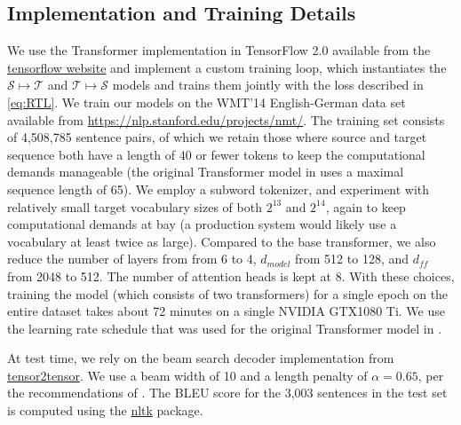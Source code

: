 \documentclass[11pt,a4paper]{article}
\begin{document}
\subsection{Implementation and Training Details}
We use the Transformer implementation in TensorFlow 2.0 available from the \href{https://www.tensorflow.org/tutorials/text/transformer}{tensorflow website} and implement a custom training loop, which instantiates the $\mathcal{S}\mapsto\mathcal{T}$ and $\mathcal{T}\mapsto\mathcal{S}$ models and trains them jointly with the loss described in \eqref{eq:RTL}. We train our models on the WMT'14 English-German data set available from \href{https://nlp.stanford.edu/projects/nmt/}{https://nlp.stanford.edu/projects/nmt/}. The training set consists of 4,508,785 sentence pairs, of which we retain those where source and target sequence both have a length of 40 or fewer tokens to keep the computational demands manageable (the original Transformer model in \citet{transformer} uses a maximal sequence length of 65). We employ a subword tokenizer, and experiment with relatively small target vocabulary sizes of both $2^{13}$ and $2^{14}$, again to keep computational demands at bay (a production system would likely use a vocabulary at least twice as large). Compared to the base transformer, we also reduce the number of layers from from 6 to 4, $d_{model}$ from 512 to 128, and $d_{ff}$ from 2048 to 512. The number of attention heads is kept at 8.
With these choices, training the model (which consists of two transformers) for a single epoch on the entire dataset takes about 72 minutes on a single NVIDIA GTX1080 Ti. We use the learning rate schedule that was used for the original Transformer model in \cite{transformer}.


At test time, we rely on the beam search decoder implementation from \href{https://github.com/tensorflow/tensor2tensor/blob/master/tensor2tensor/utils}{tensor2tensor}. We use a beam width of 10 and a length penalty of $\alpha=0.65$, per the recommendations of \citet{googlenmt}. The BLEU score for the 3,003 sentences in the test set is computed using the \href{https://www.nltk.org/}{nltk} package. 
\end{document}
